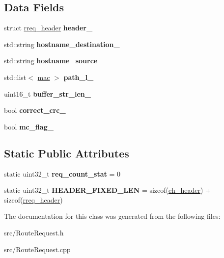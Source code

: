 \subsection*{Data Fields}
\begin{DoxyCompactItemize}
\item 
\hypertarget{classRouteRequest_a5325f0e37ac4e6098ee927c7a1db944e}{struct \hyperlink{structrreq__header}{rreq\-\_\-header} {\bfseries header\-\_\-}}\label{classRouteRequest_a5325f0e37ac4e6098ee927c7a1db944e}

\item 
\hypertarget{classRouteRequest_a3c7155a0b285f8d2d39b77f76ec3994b}{std\-::string {\bfseries hostname\-\_\-destination\-\_\-}}\label{classRouteRequest_a3c7155a0b285f8d2d39b77f76ec3994b}

\item 
\hypertarget{classRouteRequest_aadb0eeab91313d8bef7b79c847536a03}{std\-::string {\bfseries hostname\-\_\-source\-\_\-}}\label{classRouteRequest_aadb0eeab91313d8bef7b79c847536a03}

\item 
\hypertarget{classRouteRequest_a341660de5ede7819f90ddbeb846a8cd0}{std\-::list$<$ \hyperlink{structmac}{mac} $>$ {\bfseries path\-\_\-l\-\_\-}}\label{classRouteRequest_a341660de5ede7819f90ddbeb846a8cd0}

\item 
\hypertarget{classRouteRequest_a767c5db1ea47707a51ddd74ffed3a6d5}{uint16\-\_\-t {\bfseries buffer\-\_\-str\-\_\-len\-\_\-}}\label{classRouteRequest_a767c5db1ea47707a51ddd74ffed3a6d5}

\item 
\hypertarget{classRouteRequest_ad62235536e529c13904144dc7f9316d2}{bool {\bfseries correct\-\_\-crc\-\_\-}}\label{classRouteRequest_ad62235536e529c13904144dc7f9316d2}

\item 
\hypertarget{classRouteRequest_a76b50927e13bde35727f9bc1ecdd43d6}{bool {\bfseries mc\-\_\-flag\-\_\-}}\label{classRouteRequest_a76b50927e13bde35727f9bc1ecdd43d6}

\end{DoxyCompactItemize}
\subsection*{Static Public Attributes}
\begin{DoxyCompactItemize}
\item 
\hypertarget{classRouteRequest_a7bde218383ec21dac94325fb38ccfc63}{static uint32\-\_\-t {\bfseries req\-\_\-count\-\_\-stat} = 0}\label{classRouteRequest_a7bde218383ec21dac94325fb38ccfc63}

\item 
\hypertarget{classRouteRequest_a974eb2a919005fb4e76ebd0697f77740}{static uint32\-\_\-t {\bfseries H\-E\-A\-D\-E\-R\-\_\-\-F\-I\-X\-E\-D\-\_\-\-L\-E\-N} = sizeof(\hyperlink{structeh__header}{eh\-\_\-header}) + sizeof(\hyperlink{structrreq__header}{rreq\-\_\-header})}\label{classRouteRequest_a974eb2a919005fb4e76ebd0697f77740}

\end{DoxyCompactItemize}


The documentation for this class was generated from the following files\-:\begin{DoxyCompactItemize}
\item 
src/Route\-Request.\-h\item 
src/Route\-Request.\-cpp\end{DoxyCompactItemize}
